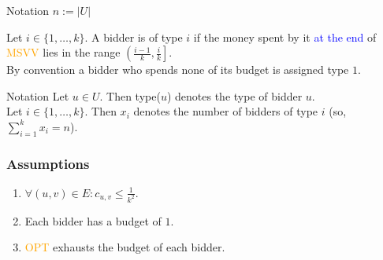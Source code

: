 \begin{frame}
    \begin{block}{Notation}
        $n := |U|$
    \end{block}
    \begin{definition}
        Let $i \in \{1, \dots, k \}$. A bidder is of \alert{type} $i$ if the money spent by it \textcolor{blue}{at the end} of \textcolor{orange}{MSVV} lies in the range $\left(\frac{i-1}{k}, \frac{i}{k} \right]$.\\
        \smallskip
        By convention a bidder who spends none of its budget is assigned type $1$.
    \end{definition}
    \begin{block}{Notation}
        Let $u \in U$. Then type($u$) denotes the type of bidder $u$.\\
        \smallskip
        Let $i \in \{1, \dots, k \}$. Then $x_i$ denotes the number of bidders of type $i$ (so, $\sum_{i=1}^k x_i = n$).
    \end{block}
\end{frame}

\begin{frame}
    \frametitle{Assumptions}
	\begin{enumerate}
        \item<1-> $\forall (u,v) \in E: c_{u,v} \leq \frac{1}{k^2}$.
        \item<1-> Each bidder has a budget of $1$.
        \item<1-> \textcolor{orange}{OPT} exhausts the budget of each bidder.
	\end{enumerate}
\end{frame}

